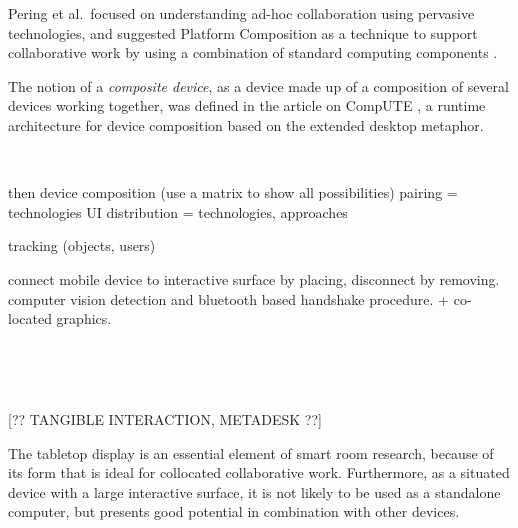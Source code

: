 Pering et al.\ focused on understanding ad-hoc collaboration using pervasive technologies, and suggested Platform Composition as a technique to support collaborative work by using a combination of standard computing components \citep{Pering:2009:platformcomp}.

The notion of a \emph{composite device}, as a device made up of a composition of several devices working together, was defined in the article on CompUTE \citep{Bardram:2010:compute}, a runtime architecture for device composition based on the extended desktop metaphor.

\hfill\\
\linebreak

then device composition (use a matrix to show all possibilities)
pairing = technologies
UI distribution = technologies, approaches

tracking (objects, users)

connect mobile device to interactive surface by placing, disconnect by removing. computer  vision detection and bluetooth based handshake procedure. + co-located graphics.
\citep{Wilson:2007:bluetable}






\hfill\\
\linebreak


\hfill\\
\linebreak

[?? TANGIBLE INTERACTION, METADESK ??]

The tabletop display is an essential element of smart room research, because of its form that is ideal for collocated collaborative work.
Furthermore, as a situated device with a large interactive surface, it is not likely to be used as a standalone computer, but presents good potential in combination with other devices.


